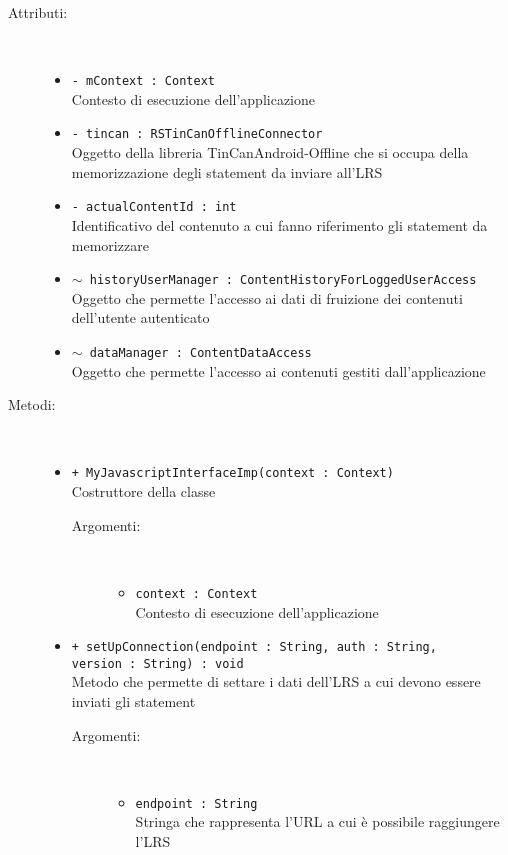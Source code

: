 \documentclass[../Tesi.tex]{subfiles}
\begin{document}
		\begin{description}
			\item[Attributi:] \
			\begin{itemize}
				\item \texttt{- mContext : Context}\\
				Contesto di esecuzione dell'applicazione

				\item \texttt{- tincan : RSTinCanOfflineConnector}\\
				Oggetto della libreria TinCanAndroid-Offline che si occupa della memorizzazione degli statement da inviare all'LRS

				\item \texttt{- actualContentId : int}\\
				Identificativo del contenuto a cui fanno riferimento gli statement da memorizzare

				\item \texttt{$\sim$ historyUserManager : ContentHistoryForLoggedUserAccess}\\
				Oggetto che permette l'accesso ai dati di fruizione dei contenuti dell'utente autenticato

				\item \texttt{$\sim$ dataManager : ContentDataAccess}\\
				Oggetto che permette l'accesso ai contenuti gestiti dall'applicazione
			\end{itemize}

			\item[Metodi:] \
			\begin{itemize}
				\item \texttt{+ MyJavascriptInterfaceImp(context : Context)}\\
				Costruttore della classe 
				\begin{description}
					\item[Argomenti:] \
					\begin{itemize}
						\item \texttt{context : Context}\\
						Contesto di esecuzione dell'applicazione
					\end{itemize}
				\end{description}

				\item \texttt{+ setUpConnection(endpoint : String, auth : String, \\version : String) : void}\\
				Metodo che permette di settare i dati dell'LRS a cui devono essere inviati gli statement
				\begin{description}
					\item[Argomenti:] \
					\begin{itemize}
						\item \texttt{endpoint : String}\\
						Stringa che rappresenta l'URL a cui è possibile raggiungere l'LRS


\end{itemize}
\end{description}
\end{itemize}
\end{description}
\end{document}
